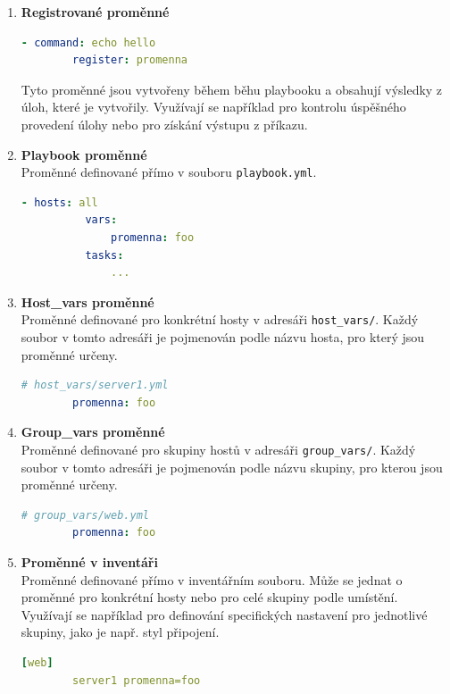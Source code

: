 \begin{itemize}
\begin{enumerate}
        \item \textbf{Registrované proměnné}
        \begin{lstlisting}[language=YAML, caption={Registrované proměnné}, label={lst:ansibleregisteredvar}, captionpos=b]
        - command: echo hello
        register: promenna
        \end{lstlisting}
        Tyto proměnné jsou vytvořeny během běhu playbooku a obsahují výsledky z úloh, které je vytvořily. 
        Využívají se například pro kontrolu úspěšného provedení úlohy nebo pro získání výstupu z příkazu.

        \item \textbf{Playbook proměnné} \\
        Proměnné definované přímo v souboru \texttt{playbook.yml}.
        \begin{lstlisting}[language=YAML, caption={Playbook proměnné}, label={lst:ansibleplaybookvar}, captionpos=b]
        - hosts: all
          vars:
              promenna: foo
          tasks:
              ...
        \end{lstlisting}

        \item \textbf{Host\_vars proměnné} \\
        Proměnné definované pro konkrétní hosty v adresáři \texttt{host\_vars/}. 
        Každý soubor v tomto adresáři je pojmenován podle názvu hosta, pro který jsou proměnné určeny.
        \begin{lstlisting}[language=YAML, caption={Proměnné hostů}, label={lst:ansiblehostvars}, captionpos=b]
        # host_vars/server1.yml
        promenna: foo
        \end{lstlisting}

        \item \textbf{Group\_vars proměnné} \\
        Proměnné definované pro skupiny hostů v adresáři \texttt{group\_vars/}. 
        Každý soubor v tomto adresáři je pojmenován podle názvu skupiny, pro kterou jsou proměnné určeny.
        \begin{lstlisting}[language=YAML, caption={Proměnné skupin}, label={lst:ansiblegroupvars}, captionpos=b]
        # group_vars/web.yml
        promenna: foo
        \end{lstlisting}

        \item \textbf{Proměnné v inventáři} \\
        Proměnné definované přímo v inventářním souboru. 
        Může se jednat o proměnné pro konkrétní hosty nebo pro celé skupiny podle umístění. 
        Využívají se například pro definování specifických nastavení pro jednotlivé skupiny, jako je např. styl připojení.
        \begin{lstlisting}[language=YAML, caption={Proměnné v inventáři}, label={lst:ansibleinventoryvar}, captionpos=b]
        [web]
        server1 promenna=foo
        \end{lstlisting}


\end{enumerate}
\end{itemize}
